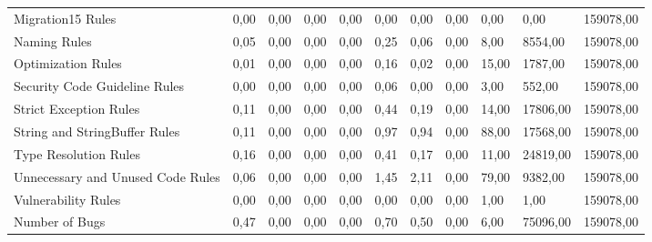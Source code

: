 \begin{table}[H]
{\begin{tabular}{@{}lp{10mm}p{10mm}p{10mm}p{10mm}llllll@{}}
Migration15 Rules                   & 0,00           & 0,00                    & 0,00             & 0,00          & 0,00                           & 0,00                              & 0,00            & 0,00            & 0,00           & 159078,00       \\
Naming Rules                        & 0,05           & 0,00                    & 0,00             & 0,00          & 0,25                           & 0,06                              & 0,00            & 8,00            & 8554,00        & 159078,00       \\
Optimization Rules                  & 0,01           & 0,00                    & 0,00             & 0,00          & 0,16                           & 0,02                              & 0,00            & 15,00           & 1787,00        & 159078,00       \\
Security Code Guideline Rules       & 0,00           & 0,00                    & 0,00             & 0,00          & 0,06                           & 0,00                              & 0,00            & 3,00            & 552,00         & 159078,00       \\
Strict Exception Rules              & 0,11           & 0,00                    & 0,00             & 0,00          & 0,44                           & 0,19                              & 0,00            & 14,00           & 17806,00       & 159078,00       \\
String and StringBuffer Rules       & 0,11           & 0,00                    & 0,00             & 0,00          & 0,97                           & 0,94                              & 0,00            & 88,00           & 17568,00       & 159078,00       \\
Type Resolution Rules               & 0,16           & 0,00                    & 0,00             & 0,00          & 0,41                           & 0,17                              & 0,00            & 11,00           & 24819,00       & 159078,00       \\
Unnecessary and   Unused Code Rules & 0,06           & 0,00                    & 0,00             & 0,00          & 1,45                           & 2,11                              & 0,00            & 79,00           & 9382,00        & 159078,00       \\
Vulnerability Rules                 & 0,00           & 0,00                    & 0,00             & 0,00          & 0,00                           & 0,00                              & 0,00            & 1,00            & 1,00           & 159078,00       \\
Number of Bugs                      & 0,47           & 0,00                    & 0,00             & 0,00          & 0,70                           & 0,50                              & 0,00            & 6,00            & 75096,00       & 159078,00       \\ 
\bottomrule
\end{tabular}
\label{description-table}
}
\end{table}









